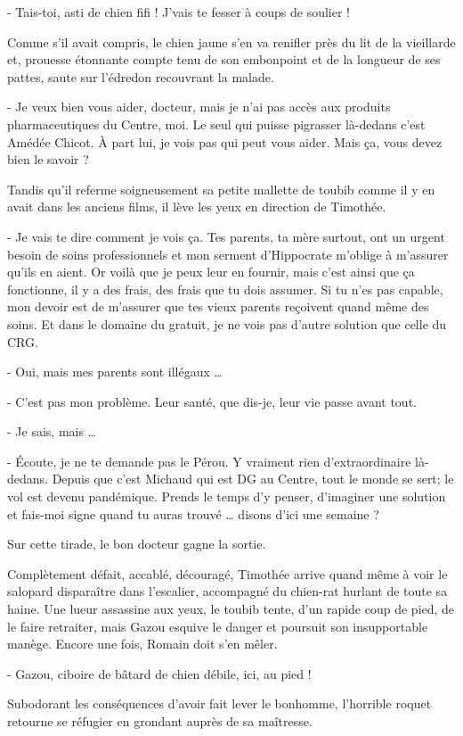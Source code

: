 - Tais-toi, asti de chien fifi ! J’vais te fesser à coups de soulier !

Comme s’il avait compris, le chien jaune s’en va renifler près du lit de la vieillarde et, prouesse étonnante compte tenu de son embonpoint et de la longueur de ses pattes, saute sur l’édredon recouvrant la malade.

- Je veux bien vous aider, docteur, mais je n’ai pas accès aux produits pharmaceutiques du Centre, moi. Le seul qui puisse pigrasser là-dedans c’est Amédée Chicot. À part lui, je vois pas qui peut vous aider. Mais ça, vous devez bien le savoir ?

Tandis qu’il referme soigneusement sa petite mallette de toubib comme il y en avait dans les anciens films, il lève les yeux en direction de Timothée.

- Je vais te dire comment je vois ça. Tes parents, ta mère surtout, ont un urgent besoin de soins professionnels et mon serment d’Hippocrate m’oblige à m’assurer qu’ils en aient. Or voilà que je peux leur en fournir, mais c’est ainsi que ça fonctionne, il y a des frais, des frais que tu dois assumer. Si tu n’es pas capable, mon devoir est de m’assurer que tes vieux parents reçoivent quand même des soins. Et dans le domaine du gratuit, je ne vois pas d’autre solution que celle du CRG.

- Oui, mais mes parents sont illégaux …

- C’est pas mon problème. Leur santé, que dis-je, leur vie passe avant tout.

- Je sais, mais …

- Écoute, je ne te demande pas le Pérou. Y vraiment rien d’extraordinaire là-dedans. Depuis que c’est Michaud qui est DG au Centre, tout le monde se sert; le vol est devenu pandémique. Prends le temps d’y penser, d’imaginer une solution et fais-moi signe quand tu auras trouvé … disons d’ici une semaine ?

Sur cette tirade, le bon docteur gagne la sortie.

Complètement défait, accablé, découragé, Timothée arrive quand même à voir le salopard disparaître dans l’escalier, accompagné du chien-rat hurlant de toute sa haine. Une lueur assassine aux yeux, le toubib tente, d’un rapide coup de pied, de le faire retraiter, mais Gazou esquive le danger et poursuit son insupportable manège. Encore une fois, Romain doit s’en mêler.

- Gazou, ciboire de bâtard de chien débile, ici, au pied !

Subodorant les conséquences d’avoir fait lever le bonhomme, l’horrible roquet retourne se réfugier en grondant auprès de sa maîtresse.

